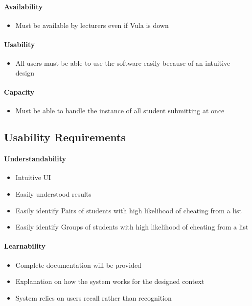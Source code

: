 \documentclass[11pt,a4paper]{article}
\begin{document}
\paragraph{Availability}
\begin{itemize}
    \item Must be available by lecturers even if Vula is down
\end{itemize}

\paragraph{Usability}
\begin{itemize}
    \item All users must be able to use the software easily because of an intuitive design
\end{itemize}

\paragraph{Capacity}
\begin{itemize}
    \item Must be able to handle the instance of all student submitting at once
\end{itemize}

\subsection{Usability Requirements}

\paragraph{Understandability}
\begin{itemize}
    \item Intuitive UI
    \item Easily understood results
    \item Easily identify Pairs of students with high likelihood of cheating from a list
    \item Easily identify Groups of students with high likelihood of cheating from a list
\end{itemize}

\paragraph{Learnability}
\begin{itemize}
    \item Complete documentation will be provided
    \item Explanation on how the system works for the designed context
    \item System relies on users recall rather than recognition
\end{itemize}
\end{document}
